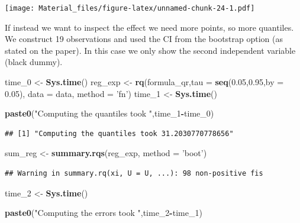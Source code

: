 \documentclass[]{book}
\newenvironment{Shaded}{\begin{snugshade}}{\end{snugshade}}
\newcommand{\KeywordTok}[1]{\textcolor[rgb]{0.13,0.29,0.53}{\textbf{#1}}}
\newcommand{\DataTypeTok}[1]{\textcolor[rgb]{0.13,0.29,0.53}{#1}}
\newcommand{\DecValTok}[1]{\textcolor[rgb]{0.00,0.00,0.81}{#1}}
\newcommand{\FloatTok}[1]{\textcolor[rgb]{0.00,0.00,0.81}{#1}}
\newcommand{\StringTok}[1]{\textcolor[rgb]{0.31,0.60,0.02}{#1}}
\newcommand{\OperatorTok}[1]{\textcolor[rgb]{0.81,0.36,0.00}{\textbf{#1}}}
\newcommand{\NormalTok}[1]{#1}
\begin{document}
\texttt{[image: Material\_files/figure-latex/unnamed-chunk-24-1.pdf]}

If instead we want to inspect the effect we need more points, so more
quantiles. We construct 19 observations and used the CI from the
bootstrap option (as stated on the paper). In this case we only show the
second independent variable (black dummy).

\begin{Shaded}
\begin{Highlighting}[]
\NormalTok{time_}\DecValTok{0}\NormalTok{ <-}\StringTok{ }\KeywordTok{Sys.time}\NormalTok{()}
\NormalTok{reg_exp <-}\StringTok{ }\KeywordTok{rq}\NormalTok{(formula_qr,}\DataTypeTok{tau =} \KeywordTok{seq}\NormalTok{(}\FloatTok{0.05}\NormalTok{,}\FloatTok{0.95}\NormalTok{,}\DataTypeTok{by =} \FloatTok{0.05}\NormalTok{), }\DataTypeTok{data =}\NormalTok{ data, }\DataTypeTok{method =} \StringTok{'fn'}\NormalTok{)}
\NormalTok{time_}\DecValTok{1}\NormalTok{ <-}\StringTok{ }\KeywordTok{Sys.time}\NormalTok{()}

\KeywordTok{paste0}\NormalTok{(}\StringTok{"Computing the quantiles took "}\NormalTok{,time_}\DecValTok{1}\OperatorTok{-}\NormalTok{time_}\DecValTok{0}\NormalTok{)}
\end{Highlighting}
\end{Shaded}

\begin{verbatim}
## [1] "Computing the quantiles took 31.2030770778656"
\end{verbatim}

\begin{Shaded}
\begin{Highlighting}[]
\NormalTok{sum_reg <-}\StringTok{ }\KeywordTok{summary.rqs}\NormalTok{(reg_exp, }\DataTypeTok{method =} \StringTok{'boot'}\NormalTok{)}
\end{Highlighting}
\end{Shaded}

\begin{verbatim}
## Warning in summary.rq(xi, U = U, ...): 98 non-positive fis
\end{verbatim}

\begin{Shaded}
\begin{Highlighting}[]
\NormalTok{time_}\DecValTok{2}\NormalTok{ <-}\StringTok{ }\KeywordTok{Sys.time}\NormalTok{()}

\KeywordTok{paste0}\NormalTok{(}\StringTok{"Computing the errors took "}\NormalTok{,time_}\DecValTok{2}\OperatorTok{-}\NormalTok{time_}\DecValTok{1}\NormalTok{)}
\end{Highlighting}
\end{Shaded}
\end{document}

